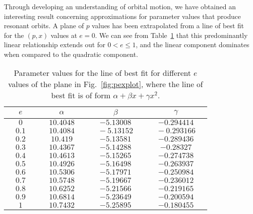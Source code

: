 Through developing an understanding of orbital motion, we have obtained an interesting result concerning approximations for parameter values that produce resonant orbits.
A plane of $p$ values has been extrapolated from a line of best fit for the $(p,x)$ values at $e=0$.
We can see from Table~\ref{table:fitvaluesAlle} that this predominantly linear relationship extends out for $0<e\leq 1$, and the linear component dominates when compared to the quadratic component.

\begin{table}[!ht]
\begin{center}
\begin{tabular}{|c|c|c|c|}
\hline
     $e$ & $\alpha$ & $\beta$ & $\gamma$ \\
     \hline
     $0$ & $10.4048$ & $-5.13008$ & $-0.294414$ \\
     \hline
     $\quad 0.1\quad $ & $\quad 10.4084 \quad$ & $\quad -5.13152 \quad$ & $\quad -0.293166 \quad$ \\
     \hline
     $0.2$ & $10.419$ & $-5.13581$ & $-0.289436$\\
     \hline
     $0.3$ & $10.4367$ & $-5.14288$ & $-0.28327$\\
     \hline
     $0.4$ & $10.4613$ & $-5.15265$ & $-0.274738$\\
     \hline
     $0.5$ & $10.4926$ & $-5.16498$ & $-0.263937$\\
     \hline
     $0.6$ & $10.5306$ & $-5.17971$ & $-0.250984$\\
     \hline
     $0.7$ & $10.5748$ & $-5.19667$ & $-0.236012$\\
     \hline
     $0.8$ & $10.6252$ & $-5.21566$ & $-0.219165$\\
     \hline
     $0.9$ & $10.6814$ & $-5.23649$ & $-0.200594$\\
     \hline
     $1$ & $10.7432$ & $-5.25895$ & $-0.180455$\\
     \hline
\end{tabular}
\caption[Parameter values for the quadratic line of best fit for different $e$ values in the $(p,e,x)$ plane of resonance]{Parameter values for the line of best fit for different $e$ values of the plane in Fig.~\eqref{fig:pexplot}, where the line of best fit is of form $\alpha + \beta x +\gamma x^2$.}
\label{table:fitvaluesAlle}
\end{center}
\end{table}

